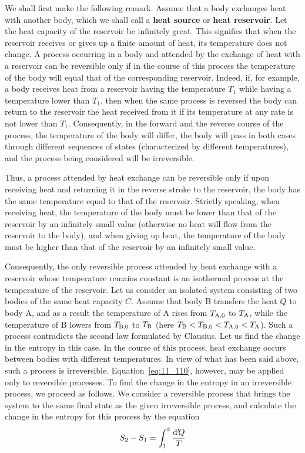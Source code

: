We shall first make the following remark. Assume that a body exchanges heat with another body, which we shall call a \textbf{heat source} or \textbf{heat reservoir}. Let the heat capacity of the reservoir be infinitely great. This signifies that when the reservoir receives or gives up a finite amount of heat, its temperature does not change. A process occurring in a body and attended by the exchange of heat with a reservoir can be reversible only if in the course of this process the temperature of the body will equal that of the corresponding reservoir. Indeed, if, for example, a body receives heat from a reservoir having the temperature $T_1$  while having a temperature lower than $T_1$, then when the same process is reversed the body can return to the reservoir the heat received from it if its temperature at any rate is not lower than $T_1$. Consequently, in the forward and the reverse course of the process, the temperature of the body will differ, the body will pass in both cases through different sequences of states (characterized by different temperatures), and the process being considered will be irreversible.

Thus, a process attended by heat exchange can be reversible only if upon receiving heat and returning it in the reverse stroke to the reservoir, the body has the same temperature equal to that of the reservoir. Strictly speaking, when receiving heat, the temperature of the body must be lower than that of the reservoir by an infinitely small value (otherwise no heat will flow from the reservoir to the body), and when giving up heat, the temperature of the body must be higher than that of the reservoir by an infinitely small value.

Consequently, the only reversible process attended by heat exchange with a reservoir whose temperature remains constant is an isothermal process at the temperature of the reservoir. Let us consider an isolated system consisting of two bodies of the same heat capacity $C$. Assume that body B transfers the heat $Q$ to body A, and as a result the temperature of A rises from $T_{\text{A,$0$}}$ to $T_{\text{A}}$, while the temperature of B lowers from $T_{\text{B,$0$}}$ to $T_{\text{B}}$ (here $T_{\text{B}}<T_{\text{B,$0$}}<T_{\text{A,$0$}}<T_{\text{A}}$). Such a process contradicts the second law formulated by Clausius. Let us find the change in the entropy in this case. In the course of this process, heat exchange occurs between bodies with different temperatures. In view of what has been said above, such a process is irreversible. Equation~\eqref{eq:11_110}, however, may be applied only to reversible processes. To find the change in the entropy in an irreversible process, we proceed as follows. We consider a reversible process that brings the system to the same final state as the given irreversible process, and calculate the change in the entropy for this process by the equation
\begin{equation}\label{eq:12_8}
	S_2 - S_1 = \int_{1}^{2} \frac{\mathrm{d}'\!Q}{T}
\end{equation}


